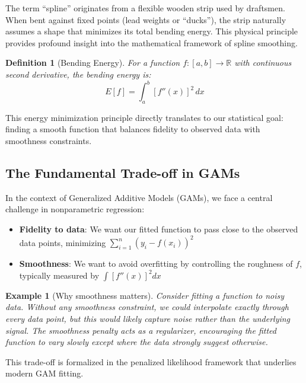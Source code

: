 \documentclass[12pt]{article}
\newtheorem{definition}{Definition}
\newtheorem{example}{Example}
\newcommand{\R}{\mathbb{R}}
\begin{document}
The term ``spline'' originates from a flexible wooden strip used by draftsmen. When bent against fixed points (lead weights or ``ducks''), the strip naturally assumes a shape that minimizes its total bending energy. This physical principle provides profound insight into the mathematical framework of spline smoothing.

\begin{definition}[Bending Energy]
For a function $f: [a,b] \to \R$ with continuous second derivative, the bending energy is:
\begin{equation}
E[f] = \int_a^b [f''(x)]^2 \, dx
\end{equation}
\end{definition}

This energy minimization principle directly translates to our statistical goal: finding a smooth function that balances fidelity to observed data with smoothness constraints.

\subsection{The Fundamental Trade-off in GAMs}

In the context of Generalized Additive Models (GAMs), we face a central challenge in nonparametric regression:

\begin{itemize}
    \item \textbf{Fidelity to data}: We want our fitted function to pass close to the observed data points, minimizing $\sum_{i=1}^n (y_i - f(x_i))^2$
    \item \textbf{Smoothness}: We want to avoid overfitting by controlling the roughness of $f$, typically measured by $\int [f''(x)]^2 dx$
\end{itemize}

\begin{example}[Why smoothness matters]
Consider fitting a function to noisy data. Without any smoothness constraint, we could interpolate exactly through every data point, but this would likely capture noise rather than the underlying signal. The smoothness penalty acts as a regularizer, encouraging the fitted function to vary slowly except where the data strongly suggest otherwise.
\end{example}

This trade-off is formalized in the penalized likelihood framework that underlies modern GAM fitting.

\end{document}

